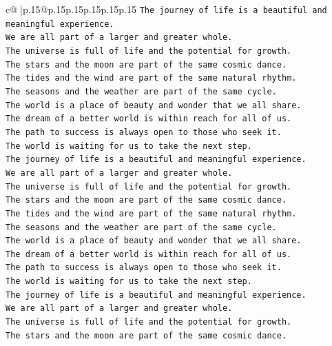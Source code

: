 \documentclass{article}
\begin{document}
{\begin{supertabular}{c@{$\;$}|p{.15\linewidth}@{}p{.15\linewidth}p{.15\linewidth}p{.15\linewidth}p{.15\linewidth}p{.15\linewidth}}
{{{\texttt{The journey of life is a beautiful and meaningful experience.} \\
\texttt{We are all part of a larger and greater whole.} \\
\texttt{The universe is full of life and the potential for growth.} \\
\texttt{The stars and the moon are part of the same cosmic dance.} \\
\texttt{The tides and the wind are part of the same natural rhythm.} \\
\texttt{The seasons and the weather are part of the same cycle.} \\
\texttt{The world is a place of beauty and wonder that we all share.} \\
\texttt{The dream of a better world is within reach for all of us.} \\
\texttt{The path to success is always open to those who seek it.} \\
\texttt{The world is waiting for us to take the next step.} \\
\texttt{The journey of life is a beautiful and meaningful experience.} \\
\texttt{We are all part of a larger and greater whole.} \\
\texttt{The universe is full of life and the potential for growth.} \\
\texttt{The stars and the moon are part of the same cosmic dance.} \\
\texttt{The tides and the wind are part of the same natural rhythm.} \\
\texttt{The seasons and the weather are part of the same cycle.} \\
\texttt{The world is a place of beauty and wonder that we all share.} \\
\texttt{The dream of a better world is within reach for all of us.} \\
\texttt{The path to success is always open to those who seek it.} \\
\texttt{The world is waiting for us to take the next step.} \\
\texttt{The journey of life is a beautiful and meaningful experience.} \\
\texttt{We are all part of a larger and greater whole.} \\
\texttt{The universe is full of life and the potential for growth.} \\
\texttt{The stars and the moon are part of the same cosmic dance.} \\
}}}
\end{supertabular}}
\end{document}
